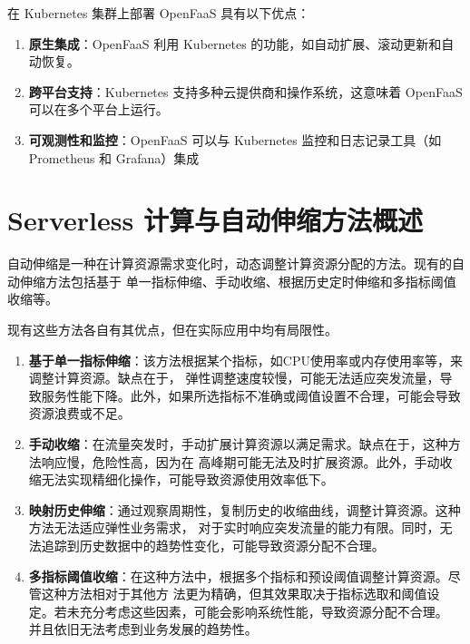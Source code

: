 \documentclass[a4paper,AutoFakeBold,oneside,12pt]{book}
\begin{document}
在 Kubernetes 集群上部署 OpenFaaS 具有以下优点：

\begin{enumerate}
	\item\textbf{原生集成}：OpenFaaS 利用 Kubernetes 的功能，如自动扩展、滚动更新和自动恢复。
	\item\textbf{跨平台支持}：Kubernetes 支持多种云提供商和操作系统，这意味着 OpenFaaS 可以在多个平台上运行。
	\item\textbf{可观测性和监控}：OpenFaaS 可以与 Kubernetes 监控和日志记录工具（如 Prometheus 和 Grafana）集成
\end{enumerate}

\section{Serverless 计算与自动伸缩方法概述}


自动伸缩是一种在计算资源需求变化时，动态调整计算资源分配的方法。现有的自动伸缩方法包括基于
单一指标伸缩、手动收缩、根据历史定时伸缩和多指标阈值收缩等。

现有这些方法各自有其优点，但在实际应用中均有局限性。

\begin{enumerate}

\item\textbf{基于单一指标伸缩}：该方法根据某个指标，如CPU使用率或内存使用率等，来调整计算资源。缺点在于，
弹性调整速度较慢，可能无法适应突发流量，导致服务性能下降。此外，如果所选指标不准确或阈值设置不合理，可能会导致资源浪费或不足。

\item\textbf{手动收缩}：在流量突发时，手动扩展计算资源以满足需求。缺点在于，这种方法响应慢，危险性高，因为在
高峰期可能无法及时扩展资源。此外，手动收缩无法实现精细化操作，可能导致资源使用效率低下。

\item\textbf{映射历史伸缩}：通过观察周期性，复制历史的收缩曲线，调整计算资源。这种方法无法适应弹性业务需求，
对于实时响应突发流量的能力有限。同时，无法追踪到历史数据中的趋势性变化，可能导致资源分配不合理。

\item\textbf{多指标阈值收缩}：在这种方法中，根据多个指标和预设阈值调整计算资源。尽管这种方法相对于其他方
法更为精确，但其效果取决于指标选取和阈值设定。若未充分考虑这些因素，可能会影响系统性能，导致资源分配不合理。
并且依旧无法考虑到业务发展的趋势性。

\end{enumerate}
\end{document}
